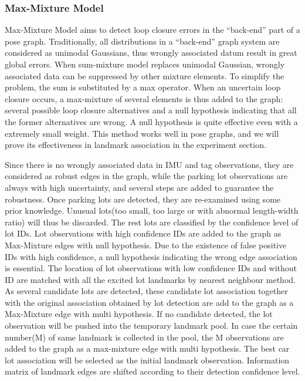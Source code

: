 \documentclass[journal]{IEEEtran}
\begin{document}
\subsubsection{Max-Mixture Model}
Max-Mixture Model \cite{Pfingsthorn2014Representing} aims to detect loop closure errors in the “back-end” part of a pose graph. 
Traditionally, all distributions in a “back-end” graph system are considered as unimodal Gaussians, thus wrongly associated datum result in great global errors. 
When sum-mixture model replaces unimodal Gaussian, wrongly associated data can be suppressed by other mixture elements. 
To simplify the problem, the sum is substituted by a max operator. 
When an uncertain loop closure occurs, a max-mixture of several elements is thus added to the graph: several possible loop closure alternatives and a null hypothesis indicating that all the former alternatives are wrong. 
A null hypothesis is quite effective even with a extremely small weight.\cite{Pfingsthorn2014Representing}  
This method works well in pose graphs\cite{Latif2014Robust}\cite{Sunderhauf2013Switchable}\cite{Cadena:2016fp}, and we will prove its effectiveness in landmark association in the experiment section.

Since there is no wrongly associated data in IMU and tag observations, they are considered as robust edges in the graph, while the parking lot observations are always with high uncertainty, and several steps are added to guarantee the robustness. 
Once parking lots are detected, they are re-examined using some prior knowledge. 
Unusual lots(too small, too large or with abnormal length-width ratio) will thus be discarded. 
The rest lots are classified by the confidence level of lot IDs. Lot observations with high confidence IDs are added to the graph as Max-Mixture edges with null hypothesis. 
Due to the existence of false positive IDs with high confidence, a null hypothesis indicating the wrong edge association is essential. 
The location of lot observations with low confidence IDs and without ID are matched with all the excited lot landmarks by nearest neighbour method. 
As several candidate lots are detected, these candidate lot association together with the original association obtained by lot detection are add to the graph as a Max-Mixture edge with multi hypothesis. 
If no candidate detected, the lot observation will be pushed into the temporary landmark pool. 
In case the certain number(M) of same landmark is collected in the pool, the M observations are added to the graph as a max-mixture edge with multi hypothesis. 
The best car lot association will be selected as the initial landmark observation. Information matrix of landmark edges are shifted according to their detection confidence level.
\end{document}
